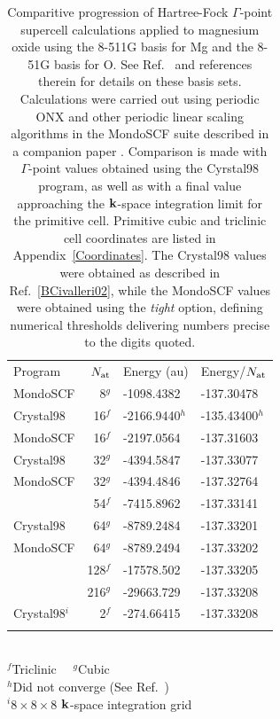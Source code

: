 \documentclass[prb,aps,nobibnotes,twocolumn,doublespace,twocolumngrid,superbib]{revtex4}
\begin{document}
\begin{table}
\caption{Comparitive progression of Hartree-Fock $\Gamma$-point supercell calculations 
applied to magnesium oxide using the 8-511G basis for Mg and the 8-51G basis for O.
See Ref.~\cite{MTowlerBasis} and references therein for details on these basis sets. 
Calculations were carried out using periodic {\sc ONX} and other periodic linear scaling
algorithms in the {\sc MondoSCF} suite described in a companion paper \cite{CTymczak04a}. 
Comparison is made with $\Gamma$-point values obtained using the {\sc Cyrstal98} program, 
as well as with a final value approaching the $\bf k$-space integration limit for the 
primitive cell.  Primitive cubic and triclinic cell coordinates are listed in 
Appendix~\ref{Coordinates}.  The {\sc Crystal98} values were obtained as 
described in Ref.~\ref{BCivalleri02}, while the {\sc MondoSCF} values were obtained using 
the {\it tight} option, defining numerical thresholds delivering numbers precise to the 
digits quoted.} \label{MgOTable}
\begin{tabular}{lrll}
\toprule
Program         & $N_{\rm at}$              & Energy (au)    & Energy/$N_{\rm at}$\\ 
\colrule
{\sc MondoSCF}       & 8$^g$    & -1098.4382     & -137.30478  \\
{\sc Crystal98}      & 16$^f$   & -2166.9440$^h$ & -135.43400$^h$ \\
{\sc MondoSCF}       & 16$^f$   & -2197.0564     & -137.31603  \\
{\sc Crystal98}      & 32$^g$   & -4394.5847     & -137.33077  \\
{\sc MondoSCF}       & 32$^g$   & -4394.4846     & -137.32764  \\
                     & 54$^f$   & -7415.8962     & -137.33141  \\
{\sc Crystal98}      & 64$^g$   & -8789.2484     & -137.33201  \\
{\sc MondoSCF}       & 64$^g$   & -8789.2494     & -137.33202  \\
                     & 128$^f$  & -17578.502     & -137.33205  \\
                     & 216$^g$  & -29663.729     & -137.33208  \\ 
\hline
{\sc Crystal98}$^i$  & 2$^f$    & -274.66415     & -137.33208  \\ 
\botrule 
\end{tabular}\\
$^f$Triclinic~~
$^g$Cubic \\
$^h$Did not converge (See Ref.~\cite{BCivalleri02}) \\
$^i 8\times8\times8$ $\bf k$-space integration grid  \\
\end{table}
\end{document}
